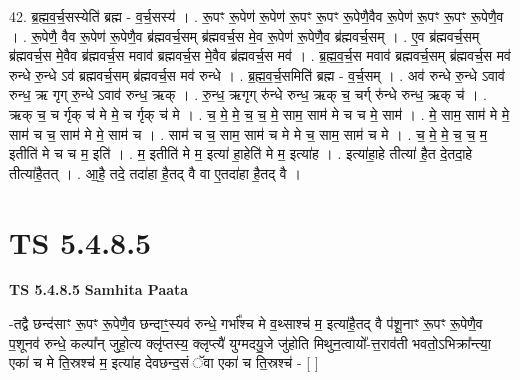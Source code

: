 \documentclass[17pt]{extarticle}
\begin{document}
42. ब्र॒ह्म॒व॒र्च॒सस्येति॑ ब्रह्म - व॒र्च॒सस्य॑ । . रू॒पꣳ रू॒पेण॑ रू॒पेण॑ रू॒पꣳ रू॒पꣳ रू॒पेणै॒वैव रू॒पेण॑ रू॒पꣳ रू॒पꣳ रू॒पेणै॒व । . रू॒पेणै॒ वैव रू॒पेण॑ रू॒पेणै॒व ब्र॑ह्मवर्च॒सम् ब्र॑ह्मवर्च॒स मे॒व रू॒पेण॑ रू॒पेणै॒व ब्र॑ह्मवर्च॒सम् । . ए॒व ब्र॑ह्मवर्च॒सम् ब्र॑ह्मवर्च॒स मे॒वैव ब्र॑ह्मवर्च॒स मवाव॑ ब्रह्मवर्च॒स मे॒वैव ब्र॑ह्मवर्च॒स मव॑ । . ब्र॒ह्म॒व॒र्च॒स मवाव॑ ब्रह्मवर्च॒सम् ब्र॑ह्मवर्च॒स मव॑ रुन्धे रु॒न्धे ऽव॑ ब्रह्मवर्च॒सम् ब्र॑ह्मवर्च॒स मव॑ रुन्धे । . ब्र॒ह्म॒व॒र्च॒समिति॑ ब्रह्म - व॒र्च॒सम् । . अव॑ रुन्धे रु॒न्धे ऽवाव॑ रुन्ध॒ ऋ गृग् रु॒न्धे ऽवाव॑ रुन्ध॒ ऋक् । . रु॒न्ध॒ ऋगृग् रु॑न्धे रुन्ध॒ ऋक् च॒ चर्ग् रु॑न्धे रुन्ध॒ ऋक् च॑ । . ऋक् च॒ च र्गृक् च॑ मे मे॒ च र्गृक् च॑ मे । . च॒ मे॒ मे॒ च॒ च॒ मे॒ साम॒ साम॑ मे च च मे॒ साम॑ । . मे॒ साम॒ साम॑ मे मे॒ साम॑ च च॒ साम॑ मे मे॒ साम॑ च । . साम॑ च च॒ साम॒ साम॑ च मे मे च॒ साम॒ साम॑ च मे । . च॒ मे॒ मे॒ च॒ च॒ म॒ इतीति॑ मे च च म॒ इति॑ । . म॒ इतीति॑ मे म॒ इत्या॑ हा॒हेति॑ मे म॒ इत्या॑ह । . इत्या॑हा॒हे तीत्या॑ है॒त दे॒तदा॒हे तीत्या॑है॒तत् । . आ॒है॒ तदे॒ तदा॑हा है॒तद् वै वा ए॒तदा॑हा है॒तद् वै । \newline
\pagebreak
{}

\section{ TS 5.4.8.5 }

\textbf{TS 5.4.8.5 } \newline
\textbf{Samhita Paata} \newline

-तद्वै छन्द॑साꣳ रू॒पꣳ रू॒पेणै॒व छन्दाꣳ॒॒स्यव॑ रुन्धे॒ गर्भा᳚श्च मे व॒थ्साश्च॑ म॒ इत्या॑है॒तद् वै प॑शू॒नाꣳ रू॒पꣳ रू॒पेणै॒व प॒शूनव॑ रुन्धे॒ कल्पा᳚न् जुहो॒त्य क्लृ॑प्तस्य॒ क्लृप्त्यै॑ युग्मदयु॒जे जु॑होति मिथुन॒त्वायो᳚-त्त॒राव॑ती भवतो॒ऽभिक्रा᳚न्त्या॒ एका॑ च मे ति॒स्रश्च॑ म॒ इत्या॑ह देवछन्द॒सं ॅवा एका॑ च ति॒स्रश्च॑ - [  ] \newline
\end{document}
